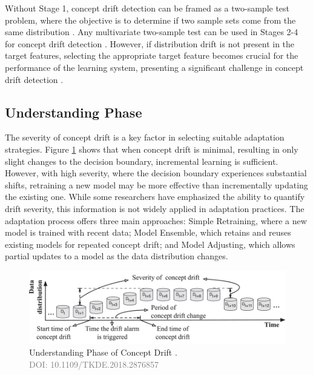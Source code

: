 Without Stage 1, concept drift detection can be framed as a two-sample test problem, where the objective is to determine if two sample sets come from the same distribution \cite{dries2009adaptive}. Any multivariate two-sample test can be used in Stages 2-4 for concept drift detection \cite{dries2009adaptive}. However, if distribution drift is not present in the target features, selecting the appropriate target feature becomes crucial for the performance of the learning system, presenting a significant challenge in concept drift detection \cite{yamada2013change}.

\subsection{Understanding Phase}
The severity of concept drift is a key factor in selecting suitable adaptation strategies. Figure \ref{fig:concept-drift-understanding} shows that when concept drift is minimal, resulting in only slight changes to the decision boundary, incremental learning is sufficient. However, with high severity, where the decision boundary experiences substantial shifts, retraining a new model may be more effective than incrementally updating the existing one. While some researchers have emphasized the ability to quantify drift severity, this information is not widely applied in adaptation practices. The adaptation process offers three main approaches: Simple Retraining, where a new model is trained with recent data; Model Ensemble, which retains and reuses existing models for repeated concept drift; and Model Adjusting, which allows partial updates to a model as the data distribution changes.

\begin{figure}[!ht]
    \centering
    \includegraphics[width=.9\textwidth]{2_Background/figures/concept_drift_understanding.png}
    \caption{Understanding Phase of Concept Drift \cite{8496795}. \\ \textcolor{gray}{\fontsize{10}{0}\selectfont DOI: 10.1109/TKDE.2018.2876857}}
    \label{fig:concept-drift-understanding}
\end{figure}


